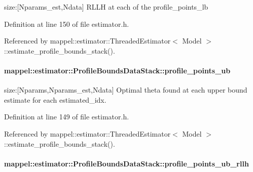 size\+:\mbox{[}Nparams\+\_\+est,Ndata\mbox{]} R\+L\+LH at each of the profile\+\_\+points\+\_\+lb 



Definition at line 150 of file estimator.\+h.



Referenced by mappel\+::estimator\+::\+Threaded\+Estimator$<$ Model $>$\+::estimate\+\_\+profile\+\_\+bounds\+\_\+stack().

\paragraph[{\texorpdfstring{profile\+\_\+points\+\_\+ub}{profile_points_ub}}]{ mappel\+::estimator\+::\+Profile\+Bounds\+Data\+Stack\+::profile\+\_\+points\+\_\+ub}\hypertarget{structmappel_1_1estimator_1_1ProfileBoundsDataStack_a3839871c217f56c0d25a94a09130295d}{}\label{structmappel_1_1estimator_1_1ProfileBoundsDataStack_a3839871c217f56c0d25a94a09130295d}


size\+:\mbox{[}Nparams,Nparams\+\_\+est,Ndata\mbox{]} Optimal theta found at each upper bound estimate for each estimated\+\_\+idx. 



Definition at line 149 of file estimator.\+h.



Referenced by mappel\+::estimator\+::\+Threaded\+Estimator$<$ Model $>$\+::estimate\+\_\+profile\+\_\+bounds\+\_\+stack().

\paragraph[{\texorpdfstring{profile\+\_\+points\+\_\+ub\+\_\+rllh}{profile_points_ub_rllh}}]{ mappel\+::estimator\+::\+Profile\+Bounds\+Data\+Stack\+::profile\+\_\+points\+\_\+ub\+\_\+rllh}\hypertarget{structmappel_1_1estimator_1_1ProfileBoundsDataStack_a9f2c221a0b1b9b60c4422bfa8e588166}{}\label{structmappel_1_1estimator_1_1ProfileBoundsDataStack_a9f2c221a0b1b9b60c4422bfa8e588166}



